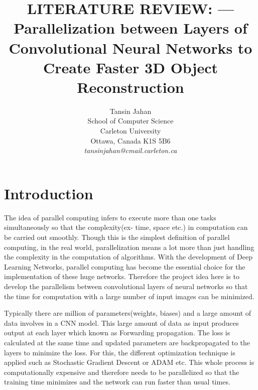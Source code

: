 \documentclass[11pt]{article}       %
\begin{document}


\title{LITERATURE REVIEW: --- Parallelization between Layers of Convolutional Neural Networks to Create Faster 3D Object Reconstruction}


\author{
Tansin Jahan\\
School of Computer Science\\
Carleton University\\
Ottawa, Canada K1S 5B6\\
{\em tansinjahan@cmail.carleton.ca}
} %

\maketitle



\section{Introduction} \label{intro}

The idea of parallel computing infers to execute more than one tasks simultaneously so that the complexity(ex- time, space etc.) in computation can be carried out smoothly. Though this is the simplest definition of parallel computing, in the real world, parallelization means a lot more than just handling the complexity in the computation of algorithms. With the development of Deep Learning Networks, parallel computing has become the essential choice for the implementation of these huge networks. Therefore the project idea here is to develop the parallelism between convolutional layers of neural networks so that the time for computation with a large number of input images can be minimized.

Typically there are million of parameters(weights, biases) and a large amount of data involves in a CNN model. This large amount of data as input produces output at each layer which known as Forwarding propagation. The loss is calculated at the same time and updated parameters are backpropagated to the layers to minimize the loss. For this, the different optimization technique is applied such as Stochastic Gradient Descent or ADAM etc. This whole process is computationally expensive and therefore needs to be parallelized so that the training time minimizes and the network can run faster than usual times. 
\end{document}
